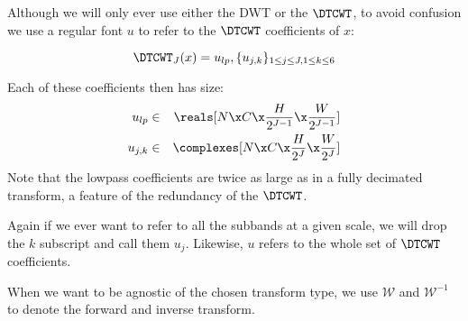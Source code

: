 Although we will only ever use either the DWT or the $\DTCWT$, to avoid
confusion we use a regular font $u$ to refer to the $\DTCWT$ coefficients of
$x$:

\begin{equation}
  \DTCWT_J(x) = u_{lp}, \{u_{j,k} \}_{1\leq j\leq J, 1\leq k\leq 6}
  \label{eq:ch6:dtcwt_coeffs}
\end{equation}

Each of these coefficients then has size:
%
\begin{eqnarray}
  u_{lp} &\in & \reals[N\x C\x \frac{H}{2^{J-1}} \x \frac{W}{2^{J-1}}] \\
  u_{j,k} &\in & \complexes[N\x C\x \frac{H}{2^{J}}\x \frac{W}{2^{J}}]
\end{eqnarray}
%
Note that the lowpass coefficients are twice as large as in a fully decimated
transform, a feature of the redundancy of the $\DTCWT$.

Again if we ever want to refer to all the subbands at a given scale, we will
drop the $k$ subscript and call them $u_j$. Likewise, $u$ refers to the whole
set of $\DTCWT$ coefficients.

When we want to be agnostic of the chosen transform type, we use
$\mathcal{W}$ and $\mathcal{W}^{-1}$ to denote the forward and inverse
transform.


